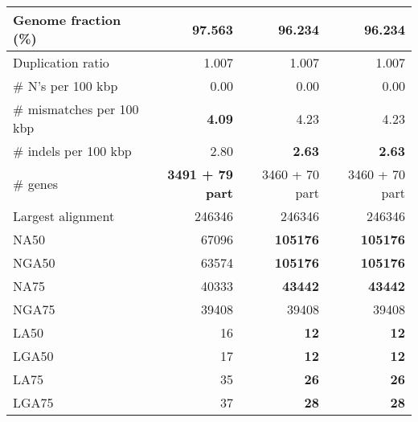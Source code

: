 \documentclass[12pt,a4paper]{article}
\begin{document}
\begin{table}[ht]
\begin{center}
\begin{tabular}{|l*{3}{|r}|}
Genome fraction (\%) & {\bf 97.563} & 96.234 & 96.234 \\ \hline
Duplication ratio & 1.007 & 1.007 & 1.007 \\ \hline
\# N's per 100 kbp & 0.00 & 0.00 & 0.00 \\ \hline
\# mismatches per 100 kbp & {\bf 4.09} & 4.23 & 4.23 \\ \hline
\# indels per 100 kbp & 2.80 & {\bf 2.63} & {\bf 2.63} \\ \hline
\# genes & {\bf 3491 + 79 part} & 3460 + 70 part & 3460 + 70 part \\ \hline
Largest alignment & 246346 & 246346 & 246346 \\ \hline
NA50 & 67096 & {\bf 105176} & {\bf 105176} \\ \hline
NGA50 & 63574 & {\bf 105176} & {\bf 105176} \\ \hline
NA75 & 40333 & {\bf 43442} & {\bf 43442} \\ \hline
NGA75 & 39408 & 39408 & 39408 \\ \hline
LA50 & 16 & {\bf 12} & {\bf 12} \\ \hline
LGA50 & 17 & {\bf 12} & {\bf 12} \\ \hline
LA75 & 35 & {\bf 26} & {\bf 26} \\ \hline
LGA75 & 37 & {\bf 28} & {\bf 28} \\ \hline
\end{tabular}
\end{center}
\end{table}
\end{document}
